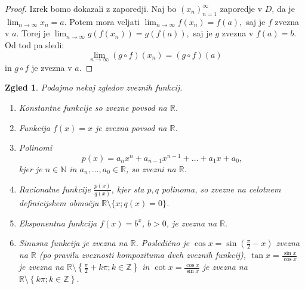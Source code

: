 \documentclass[10pt, a4paper]{article}
\newtheorem{zgled}[izr]{Zgled}
\newenvironment{noticeC}{%
  \tcolorbox[%
  notitle,
  empty,
  enhanced,  %
  breakable,
  coltext=black, 
  fontupper=\rmfamily,
  noparskip,
  sharp corners,
  boxrule=-1pt,  %
  frame hidden,
  left=7pt,  %
  right=7pt,
  top=5pt,
  bottom=5pt,
  before skip=2.5ex plus 2pt,
  after skip=2.5ex plus 2pt,
  overlay unbroken and last={%
  },
  ]}
{\endtcolorbox}
\newenvironment{dokaz}%
  {\begin{noticeC}\begin{proof}}%
  {\end{proof}\end{noticeC}}
\newcommand{\N}{\mathbb {N}}
\newcommand{\Z}{\mathbb {Z}}
\newcommand{\R}{\mathbb {R}}
\newcommand{\zap}[1]{(#1_n)_{n=1} ^{\infty}}
\newcommand{\limzap}[1]{\lim_{n \to \infty} {#1}}
\begin{document}
    \begin{dokaz}
        Izrek bomo dokazali z zaporedji.
        Naj bo $\zap{x}$ zaporedje v $D$, da je 
        $\limzap{x_n} = a.$ Potem mora veljati
        $\limzap{f(x_n)} = f(a),$ saj je $f$ zvezna v $a$. Torej je
        $\limzap{g(f(x_n))} = g(f(a)),$ saj je $g$ zvezna v $f(a) = b.$ Od tod pa sledi:
        $$\limzap{(g \circ f)(x_n)} = (g \circ f)(a)$$ in $g \circ f$ je zvezna v $a$.
    \end{dokaz}

\begin{zgled}
    Podajmo nekaj zgledov zveznih funkcij.

    \begin{enumerate}
        \item Konstantne funkcije so zvezne povsod na $\R$.
        \item Funkcija $f(x) = x$ je zvezna povsod na $\R$.
        \item Polinomi $$p(x) = a_n x^n + a_{n-1} x^{n-1} + \dots + a_1 x + a_0,$$ kjer je $n \in \N$ in $a_n,\dots,a_0 \in \R$, so zvezni na $\R$.
        \item Racionalne funkcije $\frac{p(x)}{q(x)}$, kjer sta $p,q$ polinoma, so zvezne na celotnem definicijskem območju $\R \setminus\{x; q(x) =0\}$.
        \item Eksponentna funkcija $f(x) = b^x$, $b >0$, je zvezna na $\R.$
        \item Sinusna funkcija je zvezna na $\R$.
        Posledično je $\cos x = \sin{\left( \frac{\pi}{2}-x \right)}$ zvezna na $\R$ (po pravilu zveznosti kompozituma dveh zveznih funkcij),
        $\tan x = \frac{\sin x}{\cos x}$ je zvezna na $\R \setminus \left\lbrace \frac{\pi}{2} + k\pi; k \in \Z \right\rbrace$ in $\cot x = \frac{\cos x}{\sin x}$ je zvezna na $\R \setminus \left\lbrace k\pi; k \in \Z \right\rbrace$.
    \end{enumerate}
\end{zgled}
\end{document}

